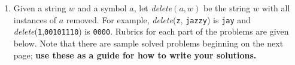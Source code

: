 \documentclass[11pt]{article}
\def\Sym#1{\texttt{\color{BrickRed}#1}}
\begin{document}

\begin{enumerate}


\item
Given a string $w$ and a symbol $a$, let \emph{delete}$(a, w)$ be the string $w$ with all instances of $a$ removed. For example, \emph{delete}(\Sym{z}, \Sym{jazzy}) is \Sym{jay} and \emph{delete}(\Sym{1},\Sym{00101110}) is \Sym{0000}.
Rubrics for each part of the problems are given below.
Note that there are sample solved problems beginning on the next page; \textbf{use these
as a guide for how to write your solutions.}


\end{enumerate}
\end{document}
